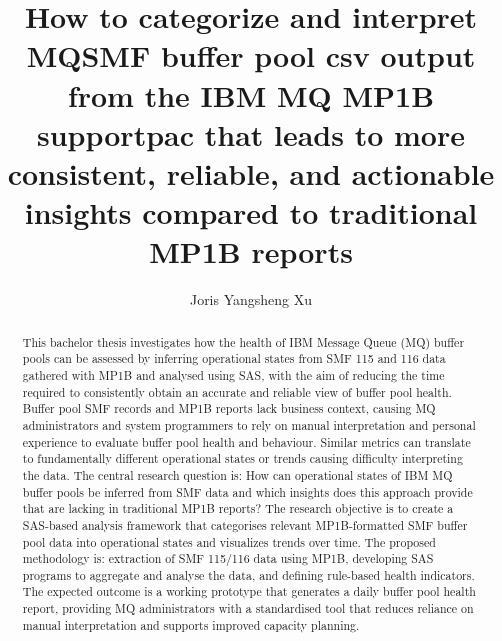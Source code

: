 \documentclass[english]{hogent-article}
\title{How to categorize and interpret MQSMF buffer pool csv output from the IBM MQ MP1B supportpac that leads to more consistent, reliable, and actionable insights compared to traditional MP1B reports}
\author{Joris Yangsheng Xu}
\begin{document}
\begin{abstract}  
  This bachelor thesis investigates how the health of IBM Message Queue (MQ) buffer pools can be assessed by inferring operational states from SMF 115 and 116 data gathered with MP1B and analysed using SAS, with the aim of reducing the time required to consistently obtain an accurate and reliable view of buffer pool health. Buffer pool SMF records and MP1B reports lack business context, causing MQ administrators and system programmers to rely on manual interpretation and personal experience to evaluate buffer pool health and behaviour. Similar metrics can translate to fundamentally different operational states or trends causing difficulty interpreting the data. The central research question is: How can operational states of IBM MQ buffer pools be inferred from SMF data and which insights does this approach provide that are lacking in traditional MP1B reports? The research objective is to create a SAS-based analysis framework that categorises relevant MP1B-formatted SMF buffer pool data into operational states and visualizes trends over time. The proposed methodology is: extraction of SMF 115/116 data using MP1B, developing SAS programs to aggregate and analyse the data, and defining rule-based health indicators. The expected outcome is a working prototype that generates a daily buffer pool health report, providing MQ administrators with a standardised tool that reduces reliance on manual interpretation and supports improved capacity planning.
\end{abstract}

\tableofcontents



\printbibliography[heading=bibintoc]
\end{document}
